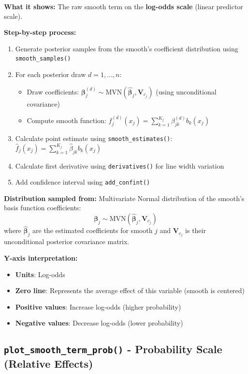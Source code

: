 \documentclass[11pt, a4paper]{article}
\begin{document}
\textbf{What it shows:} The raw smooth term on the \textbf{log-odds scale} (linear predictor scale).

\textbf{Step-by-step process:}
\begin{enumerate}
   \item Generate posterior samples from the smooth's coefficient distribution using \texttt{smooth\_samples()}
   \item For each posterior draw $d = 1, ..., n$:
   \begin{itemize}
       \item Draw coefficients: $\boldsymbol{\beta}_j^{(d)} \sim \text{MVN}(\hat{\boldsymbol{\beta}}_j, \mathbf{V}_{c_j})$ (using unconditional covariance)
       \item Compute smooth function: $f_j^{(d)}(x_j) = \sum_{k=1}^{K_j} \beta_{jk}^{(d)} b_k(x_j)$
   \end{itemize}
   \item Calculate point estimate using \texttt{smooth\_estimates()}: $\hat{f}_j(x_j) = \sum_{k=1}^{K_j} \hat{\beta}_{jk} b_k(x_j)$
   \item Calculate first derivative using \texttt{derivatives()} for line width variation
   \item Add confidence interval using \texttt{add\_confint()}
\end{enumerate}

\textbf{Distribution sampled from:} Multivariate Normal distribution of the smooth's basis function coefficients:
$$\boldsymbol{\beta}_j \sim \text{MVN}(\hat{\boldsymbol{\beta}}_j, \mathbf{V}_{c_j})$$
where $\hat{\boldsymbol{\beta}}_j$ are the estimated coefficients for smooth $j$ and $\mathbf{V}_{c_j}$ is their unconditional posterior covariance matrix.

\textbf{Y-axis interpretation:}
\begin{itemize}
   \item \textbf{Units}: Log-odds
   \item \textbf{Zero line}: Represents the average effect of this variable (smooth is centered)
   \item \textbf{Positive values}: Increase log-odds (higher probability)
   \item \textbf{Negative values}: Decrease log-odds (lower probability)
\end{itemize}

\subsection*{\texttt{plot\_smooth\_term\_prob()} - Probability Scale (Relative Effects)}
\end{document}
